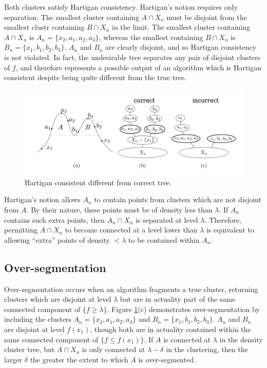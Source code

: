 \documentclass{article}
\begin{document}
Both clusters satisfy Hartigan consistency. Hartigan's notion requires only separation: {\color{red} The smallest cluster containing $A \cap X_n$ must be disjoint from the smallest clustr containing $B \cap X_n$ in the limit.} The smallest cluster containing $A \cap X_n$ is $A_n = \{x_2, a_1, a_2, a_3\}$, whereas the smallest containing $B \cap X_n$ is $B_n = \{x_1, b_1, b_2, b_3\}$. $A_n$ and $B_n$ are clearly disjoint, and so Hartigan consistency is not violated. In fact, the undesirable tree separates any pair of disjoint clusters of $f$, and therefore represents a possible output of an algorithm which is Hartigan consistent despite being quite different from the true tree. 

\begin{figure}[h!]
\centering
\includegraphics[scale=0.3]{figure1.png}
\caption{Hartigan consistent different from correct tree.}
\label{fig:harticonsis}
\end{figure}

Hartigan's notion allows $A_n$ to contain points from clusters which are not disjoint from $A$. By their nature, these points must be of density less than $\lambda$. If $A_n$ contains such extra points, then $A_n \cap X_n$ is separated at level $\lambda$. Therefore, permitting $A \cap X_n$ to become connected at a level lower than $\lambda$ is equivalent to allowing ``extra'' points of density $< \lambda$ to be contained within $A_n$.

\subsection{Over-segmentation}

Over-segmentation occurs when an algorithm fragments a true cluster, returning clusters which are disjoint at level $\lambda$ but are in actuality part of the same connected component of $\{f \geq \lambda\}$. {\color{red} Figure \ref{fig:harticonsis}(c) demonstrates over-segmentation by including the clusters $A_n = \{x_2, a_1, a_2, a_3\}$ and $B_n = \{x_1, b_1, b_2, b_3\}$. $A_n$ and $B_n$ are disjoint at level $f(x_1)$, though both are in actuality contained within the same connected component of $\{f \leq f(x_1)\}$.} If $A$ is connected at $\lambda$ in the density cluster tree, but $A \cap X_n$ is only connected at $\lambda - \delta$ in the clustering, then the larger $\delta$ the greater the extent to which $A$ is over-segmented.
\end{document}
